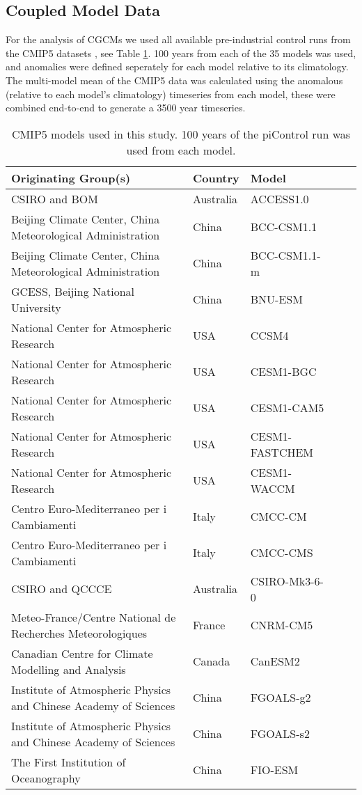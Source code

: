 \subsection{Coupled Model Data}

For the analysis of CGCMs we used all available pre-industrial control runs from 
the CMIP5 datasets \citep{Taylor2012}, see Table \ref{tab:cmip5}. 100 years from 
each of the 35 models was used, and anomalies were defined seperately for each 
model relative to its climatology. The multi-model mean of the CMIP5 data was 
calculated using the anomalous (relative to each model’s climatology) timeseries 
from each model, these were combined end-to-end to generate a 3500 year 
timeseries. 

\begin{center}
	\begin{table}[h]
	\caption{CMIP5 models used in this study. 100 years of the piControl run was 
	used from each model.}
		\label{tab:cmip5}
		\tiny
	\begin{tabular}{ l  l  l  l l}
		Originating Group(s) & Country & Model \\ \hline
		CSIRO and BOM & Australia & ACCESS1.0 \\
Beijing Climate Center, China Meteorological Administration & China & BCC-CSM1.1 
		 \\
Beijing Climate Center, China Meteorological Administration & China & 
		BCC-CSM1.1-m \\
		GCESS, Beijing National University & China & BNU-ESM \\
National Center for Atmospheric Research & USA & CCSM4 \\
		National Center for Atmospheric Research  & USA & CESM1-BGC  \\
		National Center for Atmospheric Research  & USA & CESM1-CAM5  \\
		National Center for Atmospheric Research  & USA & CESM1-FASTCHEM \\
		National Center for Atmospheric Research  & USA & CESM1-WACCM  \\
		Centro Euro-Mediterraneo per i Cambiamenti & Italy & CMCC-CM \\
		Centro Euro-Mediterraneo per i Cambiamenti & Italy & CMCC-CMS \\
		CSIRO and QCCCE & Australia & CSIRO-Mk3-6-0 \\
Meteo-France/Centre National de Recherches Meteorologiques & France & CNRM-CM5 
		\\
Canadian Centre for Climate Modelling and Analysis & Canada & CanESM2 \\
		Institute of Atmospheric Physics and Chinese Academy of Sciences & China & 
		FGOALS-g2 \\
		Institute of Atmospheric Physics and Chinese Academy of Sciences & China & 
		FGOALS-s2 \\
		The First Institution of Oceanography & China & FIO-ESM \\


\end{tabular}
\end{table}
\end{center}
